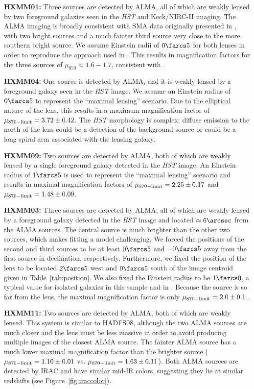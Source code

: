 \documentclass[iop]{emulateapj}
\begin{document}
{\bf HXMM01:} Three sources are detected by ALMA, all of which are weakly
lensed by two foreground galaxies seen in the {\it HST} and Keck/NIRC-II
imaging.  The ALMA imaging is broadly consistent with SMA data originally
presented in \citet{Fu:2013lr}, with two bright sources and a much fainter
third source very close to the more southern bright source.  We assume Einstein
radii of $0\farcs5$ for both lenses in order to reproduce the approach used in
\citet{Fu:2013lr}.  This results in magnification factors for the three sources
of $\mu_{870} \approx 1.6 - 1.7$, consistent with \citet{Fu:2013lr}.

{\bf HXMM04:} One source is detected by ALMA, and it is weakly lensed by a
foreground galaxy seen in the {\it HST} image.  We assume an Einstein radius of
$0\farcs5$ to represent the ``maximal lensing'' scenario.  Due to the
elliptical nature of the lens, this results in a maximum magnification factor of
$\mu_{\rm 870-limit} = 3.72 \pm 0.42$.  The {\it HST} morphology is complex: diffuse
emission to the north of the lens could be a detection of the background source
or could be a long spiral arm associated with the lensing galaxy.

{\bf HXMM09:} Two sources are detected by ALMA, both of which are weakly lensed
by a single foreground galaxy detected in the {\it HST} image.  An Einstein
radius of $1\farcs5$ is used to represent the ``maximal lensing'' scenario and
results in maximal magnification factors of $\mu_{\rm 870-limit} = 2.25 \pm
0.17$ and $\mu_{\rm 870-limit} = 1.48 \pm 0.09$.

{\bf HXMM03:} Three sources are detected by ALMA, all of which are weakly
lensed by a foreground galaxy detected in the {\it HST} image and located
$\approx 6\arcsec$ from the ALMA sources.  The central source is much brighter
than the other two sources, which makes fitting a model challenging.  We forced
the positions of the second and third sources to be at least $0\farcs5$ and
$-0\farcs5$ away from the first source in declination, respectively.
Furthermore, we fixed the position of the lens to be located $2\farcs5$ west
and $0\farcs5$ south of the image centroid given in Table~\ref{tab:position}.
We also fixed the Einstein radius to be $1\farcs0$, a typical value for
isolated galaxies in this sample and in \citet{Bussmann:2013lr}.  Because the
source is so far from the lens, the maximal magnification factor is only
$\mu_{\rm 870-limit} = 2.0 \pm 0.1$.

{\bf HXMM11:} Two sources are detected by ALMA, both of which are weakly
lensed.  This system is similar to HADFS08, although the two ALMA sources are
much closer and the lens must be less massive in order to avoid producing
multiple images of the closest ALMA source.  The fainter ALMA source has a much
lower maximal magnification factor than the brighter source ($\mu_{\rm
870-limit} = 1.10 \pm 0.01$ vs.  $\mu_{\rm 870-limit} = 1.63 \pm 0.11$).  Both
ALMA sources are detected by IRAC and have similar mid-IR colors, suggesting
they lie at similar redshifts (see Figure~\ref{fig:iraccolor}).
\end{document}
